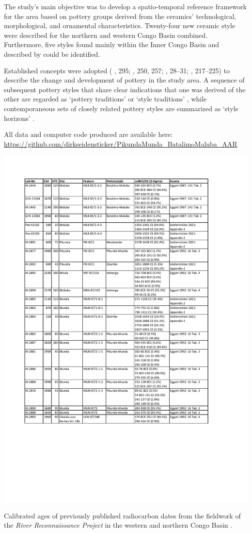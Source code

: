 \documentclass[smallextended,natbib]{svjour3}       %
\begin{document}
The study’s main objective was to develop a spatio-temporal reference framework for the area based on pottery groups derived from the ceramics' technological, morphological, and ornamental characteristics. Twenty-four new ceramic style were described for the northern and western Congo Basin combined. Furthermore, five styles found mainly within the Inner Congo Basin and described by \citet{Wotzka.1995} could be identified.

Established concepts were adopted (\citeauthor{Eggert.1983} \citeyear{Eggert.1983}, 295; \citeyear{Eggert.1984}, 250, 257; \citeyear{Eggert.1988}, 28--31; \citeauthor{Wotzka.1995} \citeyear{Wotzka.1995}, 217--225) to describe the change and development of pottery in the study area. A sequence of subsequent pottery styles that share clear indications that one was derived of the other are regarded as ‘pottery traditions’ or ‘style traditions’ \citep{Rouse.1957,Willey.1945}, while contemporaneous sets of closely related pottery styles are summarized as ‘style horizons’ \citep[108--111]{Kroeber.1944}.

All data and computer code produced are available here: \url{https://github.com/dirkseidensticker/PikundaMunda_BatalimoMaluba_AAR}

\begin{table}[p]
	\centering
	\includegraphics[width=.9\textwidth]{Tab_Old14C.pdf}
	\caption{Calibrated ages \citep{Reimer.2020} of previously published radiocarbon dates from the fieldwork of the \textit{River Reconnaissance Project} in the western and northern Congo Basin \citep[Appendix 2]{Seidensticker.2021e}.}
	\label{tab:14Cold}	
\end{table}
\end{document}
